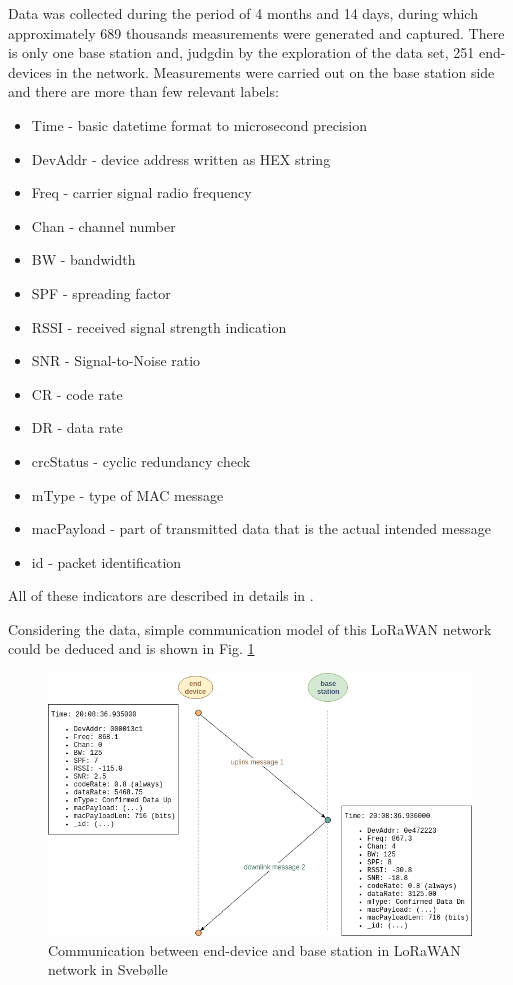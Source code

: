 \documentclass[10pt, a4paper]{article} %
\begin{document}
Data was collected during the period of 4 months and 14 days, during which approximately 689 thousands measurements were generated and captured. 
There is only one base station and, judgdin by the exploration of the data set, 251 end-devices in the network.
Measurements were carried out on the base station side and there are more than few relevant labels:
\begin{itemize}
	\item Time - basic datetime format to microsecond precision
    \item DevAddr - device address written as HEX string
    \item Freq - carrier signal radio frequency
    \item Chan - channel number
    \item BW - bandwidth
    \item SPF - spreading factor
    \item RSSI - received signal strength indication
    \item SNR - Signal-to-Noise ratio
    \item CR - code rate 
    \item DR - data rate
    \item crcStatus - cyclic redundancy check
    \item mType - type of MAC message
    \item macPayload - part of transmitted data that is the actual intended message
    \item id - packet identification
\end{itemize}

All of these indicators are described in details in \cite{Aloys_LoRa}.

Considering the data, simple communication model of this LoRaWAN network could be deduced and is shown in Fig. \ref{communication}
\begin{figure}
	\centering
	\includegraphics[scale=.5]{images/Svebolle-ed-bs-model.png} %
	\caption{Communication between end-device and base station in LoRaWAN network in Svebølle} %
	\label{communication} 
\end{figure}
\end{document}

